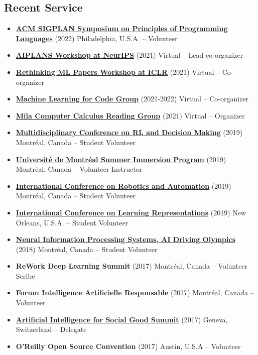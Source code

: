 \documentclass[letterpaper,11pt]{article}
\newcommand{\resumeItem}[2]{
  \item\small{\textbf{#1}{ #2 }}
}
\newcommand{\resumeSubItem}[2]{\resumeItem{#1}{#2}}
\newcommand{\resumeSubHeadingListStart}{\begin{itemize}[leftmargin=*]}
\newcommand{\resumeSubHeadingListEnd}{\end{itemize}}
\begin{document}
\begin{justify}
\section{Recent Service}
\resumeSubHeadingListStart
\resumeSubItem{\href{https://popl22.sigplan.org/}{ACM SIGPLAN Symposium on Principles of Programming Languages}}{(2022) Philadelphia, U.S.A. -- Volunteer}
\resumeSubItem{\href{https://aiplans.github.io/}{AIPLANS Workshop at NeurIPS}}{(2021) Virtual -- Lead co-organizer}
\resumeSubItem{\href{https://rethinkingmlpapers.github.io/}{Rethinking ML Papers Workshop at ICLR}}{(2021) Virtual -- Co-organizer}
\resumeSubItem{\href{https://ml4code-mtl.github.io/}{Machine Learning for Code Group}}{(2021-2022) Virtual -- Co-organizer}
\resumeSubItem{\href{https://compcalc.github.io/}{Mila Computer Calculus Reading Group}}{(2021) Virtual -- Organizer}
\resumeSubItem{\href{http://rldm.org/}{Multidisciplinary Conference on RL and Decision Making}}{(2019) Montr\'eal, Canada -- Student Volunteer}
\resumeSubItem{\href{https://admission.umontreal.ca/en/summer-immersion-program/a-summer-in-montreal/}{Universit\'e de Montr\'eal Summer Immersion Program}}{(2019) Montr\'eal, Canada -- Volunteer Instructor}
\resumeSubItem{\href{https://www.icra2019.org/}{International Conference on Robotics and Automation}}{(2019)  Montr\'eal, Canada -- Student Volunteer}
\resumeSubItem{\href{https://iclr.cc/Conferences/2019}{International Conference on Learning Representations}}{(2019) New Orleans, U.S.A. -- Student Volunteer}
\resumeSubItem{\href{https://www.duckietown.org/research/ai-driving-olympics}{Neural Information Processing Systems, AI Driving Olympics}}{(2018) Montr\'eal, Canada -- Student Volunteer}
\resumeSubItem{ReWork Deep Learning Summit}{(2017) Montr\'eal, Canada -- Volunteer Scribe}
\resumeSubItem{\href{https://sites.grenadine.co/sites/forumiaresponsableumontreal/fr/forumiaresponsableumontreal}{Forum Intelligence Artificielle Responsable}}{(2017) Montr\'eal, Canada -- Volunteer}
\resumeSubItem{\href{https://aiforgood.itu.int/}{Artificial Intelligence for Social Good Summit}}{(2017) Geneva, Switzerland -- Delegate}
\resumeSubItem{O'Reilly Open Source Convention}{(2017) Austin, U.S.A -- Volunteer}
\resumeSubHeadingListEnd


\end{justify}
\end{document}
